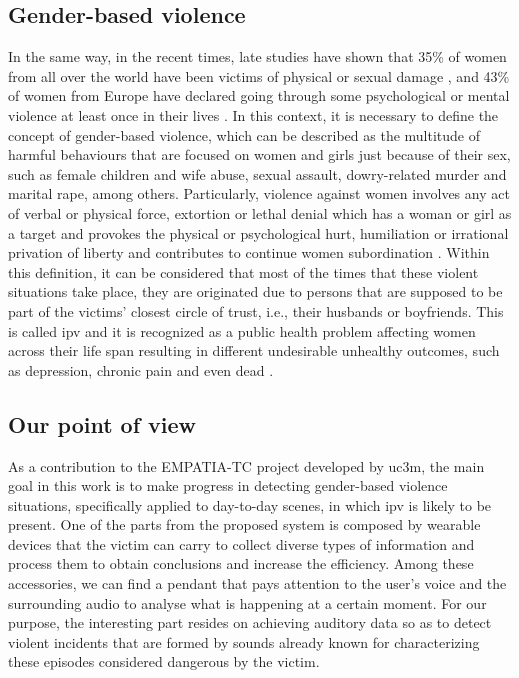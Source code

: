 \subsection{Gender-based violence}

	 In the same way, in the recent times, late studies have shown that 35\% of women from all over the world have been victims of physical or sexual damage \cite{WHO2013}, and 43\% of women from Europe have declared going through some psychological or mental violence at least once in their lives \cite{EuropeanUnionAgencyforFundamentalRights2014}. In this context, it is necessary to define the concept of gender-based violence, which can be described as the multitude of harmful behaviours that are focused on women and girls just because of their sex, such as female children and wife abuse, sexual assault, dowry-related murder and marital rape, among others. Particularly, violence against women involves any act of verbal or physical force, extortion or lethal denial which has a woman or girl as a target and provokes the physical or psychological hurt, humiliation or irrational privation of liberty and contributes to continue women subordination \cite{Heise1999}. Within this definition, it can be considered that most of the times that these violent situations take place, they are originated due to persons that are supposed to be part of the victims' closest circle of trust, i.e., their husbands or boyfriends. This is called \acrfull{ipv}  and it is recognized as a public health problem affecting women across their life span resulting in different undesirable unhealthy outcomes, such as depression, chronic pain and even dead \cite{Beyer2015}.
	
\subsection{Our point of view} 
\label{subsection:our-point-of-view}

	As a contribution to the EMPATIA-TC project developed by \acrlong{uc3m}, the main goal in this work is to make progress in detecting gender-based violence situations, specifically applied to day-to-day scenes, in which \acrshort{ipv} is likely to be present. One of the parts from the proposed system is composed by wearable devices that the victim can carry to collect diverse types of information and process them to obtain conclusions and increase the efficiency. Among these accessories, we can find a pendant that pays attention to the user's voice and the surrounding audio to analyse what is happening at a certain moment. For our purpose, the interesting part resides on achieving auditory data so as to detect violent incidents that are formed by sounds already known for characterizing these episodes considered dangerous by the victim.
	
